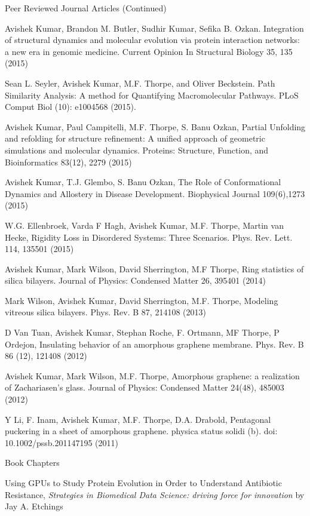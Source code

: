 \begin{cventries}
\cventry
    {}
    {Peer Reviewed Journal Articles (Continued)}
    {}
    {}
    {
\begin{cvitems}
    \vspace{-1\baselineskip}
    \setlength\itemsep{.5em}
    \item Avishek Kumar, Brandon M. Butler, Sudhir Kumar, Sefika B. Ozkan. Integration of structural
dynamics and molecular evolution via protein interaction networks: a new era in genomic medicine.
Current Opinion In Structural Biology 35, 135 (2015)
    \item Sean L. Seyler, Avishek Kumar, M.F. Thorpe, and Oliver Beckstein. Path Similarity Analysis: A
method for Quantifying Macromolecular Pathways. PLoS Comput Biol (10): e1004568 (2015).
    \item Avishek Kumar, Paul Campitelli, M.F. Thorpe, S. Banu Ozkan, Partial Unfolding and refolding for
structure refinement: A unified approach of geometric simulations and molecular dynamics. Proteins:
Structure, Function, and Bioinformatics 83(12), 2279 (2015)
    \item Avishek Kumar, T.J. Glembo, S. Banu Ozkan, The Role of Conformational Dynamics and Allostery in
Disease Development. Biophysical Journal 109(6),1273 (2015)
    \item W.G. Ellenbroek, Varda F Hagh, Avishek Kumar, M.F. Thorpe, Martin van Hecke, Rigidity Loss in
Disordered Systems: Three Scenarios. Phys. Rev. Lett. 114, 135501 (2015)
    \item Avishek Kumar, Mark Wilson, David Sherrington, M.F Thorpe, Ring statistics of silica bilayers.
Journal of Physics: Condensed Matter 26, 395401 (2014)
    \item Mark Wilson, Avishek Kumar, David Sherrington, M.F. Thorpe, Modeling vitreous silica bilayers.
Phys. Rev. B 87, 214108 (2013)
    \item D Van Tuan, Avishek Kumar, Stephan Roche, F. Ortmann, MF Thorpe, P Ordejon, Insulating behavior
of an amorphous graphene membrane. Phys. Rev. B 86 (12), 121408 (2012)
    \item Avishek Kumar, Mark Wilson, M.F. Thorpe, Amorphous graphene: a realization of Zachariasen’s
glass. Journal of Physics: Condensed Matter 24(48), 485003 (2012)
    \item Y Li, F. Inam, Avishek Kumar, M.F. Thorpe, D.A. Drabold, Pentagonal puckering in a sheet of
amorphous graphene. physica status solidi (b). doi: 10.1002/pssb.201147195 (2011)
\end{cvitems}
}



\cventry{}
    {Book Chapters}
    {}
    {}
    {\begin{cvitems}
    \vspace{-1\baselineskip}
    \setlength\itemsep{.5em}
    \item Using GPUs to Study Protein Evolution in Order to Understand Antibiotic Resistance, \textit{Strategies in Biomedical Data Science: driving force for innovation} by Jay A. Etchings
\end{cvitems}}




\end{cventries}
